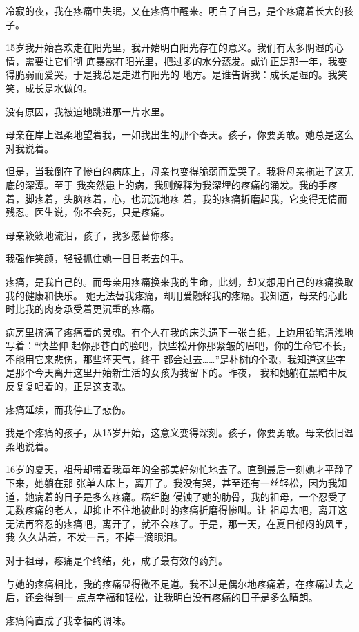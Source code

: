 		冷寂的夜，我在疼痛中失眠，又在疼痛中醒来。明白了自己，是个疼痛着长大的孩子。

		15岁我开始喜欢走在阳光里，我开始明白阳光存在的意义。我们有太多阴湿的心情，需要让它们彻
	底暴露在阳光里，把过多的水分蒸发。或许正是那一年，我变得脆弱而爱哭，于是我总是走进有阳光的
	地方。是谁告诉我：成长是湿的。我笑笑，成长是水做的。

		没有原因，我被迫地跳进那一片水里。

		母亲在岸上温柔地望着我，一如我出生的那个春天。孩子，你要勇敢。她总是这么对我说着。

		但是，当我倒在了惨白的病床上，母亲也变得脆弱而爱哭了。我将母亲拖进了这无底的深潭。至于
	我突然患上的病，我则解释为我深埋的疼痛的涌发。我的手疼着，脚疼着，头脑疼着，心，也沉沉地疼
	着，我的疼痛折磨起我，它变得无情而残忍。医生说，你不会死，只是疼痛。

		母亲簌簌地流泪，孩子，我多愿替你疼。

		我强作笑颜，轻轻抓住她一日日老去的手。

		疼痛，是我自己的。而母亲用疼痛换来我的生命，此刻，却又想用自己的疼痛换取我的健康和快乐。
	她无法替我疼痛，却用爱融释我的疼痛。我知道，母亲的心此时比我的肉身承受着更沉重的疼痛。

		病房里挤满了疼痛着的灵魂。有个人在我的床头遗下一张白纸，上边用铅笔清浅地写着：“快些仰
	起你那苍白的脸吧，快些松开你那紧皱的眉吧，你的生命它不长，不能用它来悲伤，那些坏天气，终于
	都会过去……”是朴树的个歌，我知道这些字是那个今天离开这里开始新生活的女孩为我留下的。昨夜，
	我和她躺在黑暗中反反复复唱着的，正是这支歌。

		疼痛延续，而我停止了悲伤。

		我是个疼痛的孩子，从15岁开始，这意义变得深刻。孩子，你要勇敢。母亲依旧温柔地说着。

		16岁的夏天，祖母却带着我童年的全部美好匆忙地去了。直到最后一刻她才平静了下来，她躺在那
	张单人床上，离开了。我没有哭，甚至还有一丝轻松，因为我知道，她病着的日子是多么疼痛。癌细胞
	侵蚀了她的肋骨，我的祖母，一个忍受了无数疼痛的老人，却抑止不住地被此时的疼痛折磨得惨叫。让
	祖母去吧，离开这无法再容忍的疼痛吧，离开了，就不会疼了。于是，那一天，在夏日郁闷的风里，我
	久久站着，不发一言，不掉一滴眼泪。

		对于祖母，疼痛是个终结，死，成了最有效的药剂。

		与她的疼痛相比，我的疼痛显得微不足道。我不过是偶尔地疼痛着，在疼痛过去之后，还会得到一
	点点幸福和轻松，让我明白没有疼痛的日子是多么晴朗。

		疼痛简直成了我幸福的调味。


